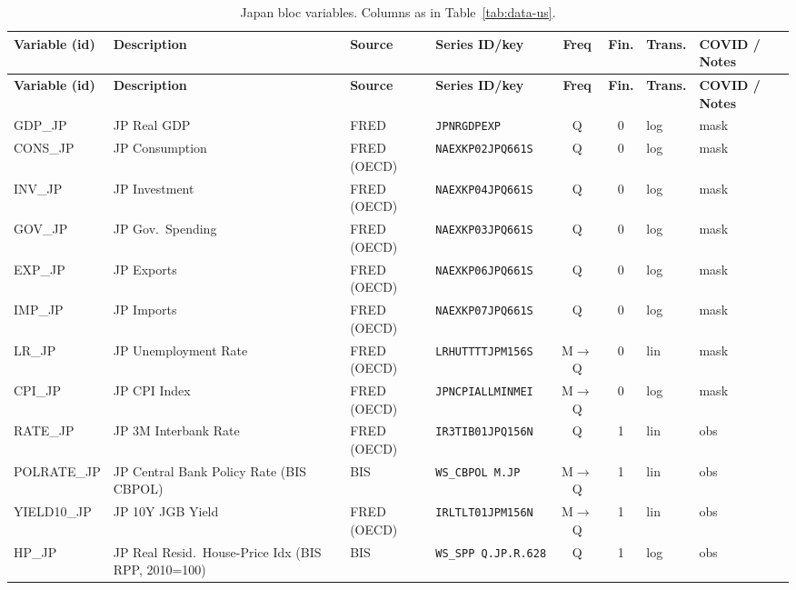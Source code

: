 {\footnotesize\setlength{\tabcolsep}{3.5pt}
\begin{longtable}{@{}>{\raggedright\arraybackslash}p{1.7cm} >{\raggedright\arraybackslash}p{2.7cm} >{\raggedright\arraybackslash}p{1.35cm} >{\raggedright\arraybackslash}p{2.55cm} c c >{\raggedright\arraybackslash}p{0.85cm} >{\raggedright\arraybackslash}p{2.75cm}@{}}
\caption{Japan bloc variables. Columns as in
Table~\ref{tab:data-us}.}\label{tab:data-jp}\\
\toprule
\textbf{Variable (id)} & \textbf{Description} & \textbf{Source} & \textbf{Series ID/key} & \textbf{Freq} & \textbf{Fin.} & \textbf{Trans.} & \textbf{COVID / Notes} \\
\midrule
\endfirsthead
\toprule
\textbf{Variable (id)} & \textbf{Description} & \textbf{Source} & \textbf{Series ID/key} & \textbf{Freq} & \textbf{Fin.} & \textbf{Trans.} & \textbf{COVID / Notes} \\
\midrule
\endhead
\bottomrule
\endfoot
GDP\_JP     & JP Real GDP & FRED & \texttt{JPNRGDPEXP} & Q & 0 & log & mask \\
CONS\_JP    & JP Consumption & FRED (OECD) & \texttt{NAEXKP02JPQ661S} & Q & 0 & log & mask \\
INV\_JP     & JP Investment & FRED (OECD) & \texttt{NAEXKP04JPQ661S} & Q & 0 & log & mask \\
GOV\_JP     & JP Gov.\ Spending & FRED (OECD) & \texttt{NAEXKP03JPQ661S} & Q & 0 & log & mask \\
EXP\_JP     & JP Exports & FRED (OECD) & \texttt{NAEXKP06JPQ661S} & Q & 0 & log & mask \\
IMP\_JP     & JP Imports & FRED (OECD) & \texttt{NAEXKP07JPQ661S} & Q & 0 & log & mask \\
LR\_JP      & JP Unemployment Rate & FRED (OECD) & \texttt{LRHUTTTTJPM156S} & M$\to$Q & 0 & lin & mask \\
CPI\_JP     & JP CPI Index & FRED (OECD) & \texttt{JPNCPIALLMINMEI} & M$\to$Q & 0 & log & mask \\
RATE\_JP    & JP 3M Interbank Rate & FRED (OECD) & \texttt{IR3TIB01JPQ156N} & Q & 1 & lin & obs \\
POLRATE\_JP & JP Central Bank Policy Rate (BIS CBPOL) & BIS & \texttt{WS\_CBPOL M.JP} & M$\to$Q & 1 & lin & obs \\
YIELD10\_JP & JP 10Y JGB Yield & FRED (OECD) & \texttt{IRLTLT01JPM156N} & M$\to$Q & 1 & lin & obs \\
HP\_JP      & JP Real Resid.\ House-Price Idx (BIS RPP, 2010=100) & BIS & \texttt{WS\_SPP\allowbreak\ Q.\allowbreak JP.\allowbreak R.628} & Q & 1 & log & obs \\

\end{longtable}}
